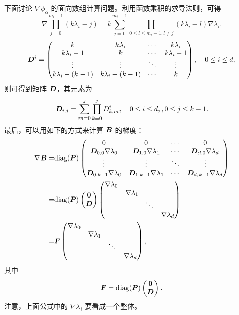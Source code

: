 \documentclass{article}
\begin{document}
下面讨论 $\nabla \phi_\alpha$ 的面向数组计算问题。利用函数乘积的求导法则，可得   
\begin{equation*}
    \nabla \prod_{j = 0}^{m_i - 1} (k\lambda_i - j)
    = k\sum_{j=0}^{m_i - 1}\prod_{0\le l \le m_i-1, l\not= j}(k\lambda_i -
    l)\nabla \lambda_i.
\end{equation*}
$$
{\boldsymbol D}^i = 
\begin{pmatrix}
k & k\lambda_i & \cdots & k\lambda_i \\
k\lambda_i - 1 & k & \cdots & k\lambda_i - 1 \\
\vdots & \vdots & \ddots & \vdots \\
k\lambda_i - (k-1) & k\lambda_i - (k-1) & \cdots & k 
\end{pmatrix}
, \quad 0 \le i \le d, 
$$
则可得到矩阵 ${\boldsymbol D}$，其元素为 
$$
{\boldsymbol D}_{i,j} = \sum_{m=0}^j\prod_{k=0}^j D^i_{k, m},\quad 0 \le i \le d,
, 0 \le j \le k-1.
$$
最后，可以用如下的方式来计算 ${\boldsymbol B}$ 的梯度：
\begin{equation*}
\begin{aligned}
\nabla {\boldsymbol B} = & \mathrm{diag}({\boldsymbol P})
\begin{pmatrix}
0 & 0 & \cdots & 0 \\
{\boldsymbol D}_{0,0} \nabla \lambda_0 & 
{\boldsymbol D}_{1,0} \nabla \lambda_1 & \cdots& 
{\boldsymbol D}_{d,0} \nabla \lambda_d \\
\vdots & \vdots & \ddots & \vdots \\
{\boldsymbol D}_{0, k-1} \nabla \lambda_0 &
{\boldsymbol D}_{1, k-1} \nabla \lambda_1 & \cdots &
{\boldsymbol D}_{d, k-1} \nabla \lambda_d 
\end{pmatrix}\\
= & \mathrm{diag}({\boldsymbol P})
\begin{pmatrix}
\mathbf 0\\
{\boldsymbol D}
\end{pmatrix}
\begin{pmatrix}
\nabla \lambda_0 &  &  & \\
 & \nabla \lambda_1 & & \\
 & & \ddots & \\
 & & & \nabla \lambda_d
\end{pmatrix}\\
= & {\boldsymbol F} 
\begin{pmatrix}
\nabla \lambda_0 &  &  & \\
 & \nabla \lambda_1 & & \\
 & & \ddots & \\
 & & & \nabla \lambda_d
\end{pmatrix},
\end{aligned}
\end{equation*}
其中
\begin{equation}\label{eq:F}
    {\boldsymbol F} = \mathrm{diag}({\boldsymbol P})
\begin{pmatrix} 
    \mathbf 0\\ {\boldsymbol D}
\end{pmatrix}.
\end{equation}
注意，上面公式中的 $\nabla \lambda_i$ 要看成一个整体。
\end{document}

